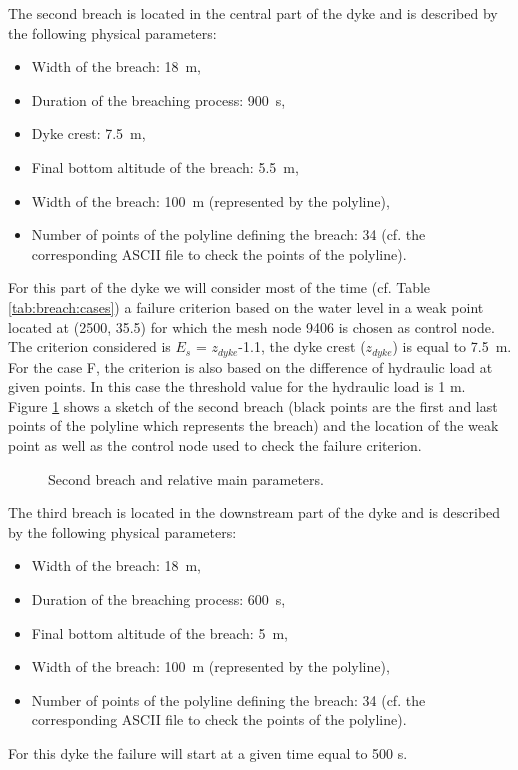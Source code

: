 The second breach is located in the central part of the dyke and is described by
the following physical parameters:
\begin{itemize}
 \item Width of the breach: 18~m,
 \item Duration of the breaching process: 900~s,
 \item Dyke crest: 7.5~m,
 \item Final bottom altitude of the breach: 5.5~m,
 \item Width of the breach: 100~m (represented by the polyline),
 \item Number of points of the polyline defining the breach: 34 (cf. the
       corresponding ASCII file to check the points of the polyline).
\end{itemize}
For this part of the dyke we will consider most of the time (cf. Table
\ref{tab:breach:cases}) a failure criterion based on the water level in a weak
point located at (2500, 35.5) for which the mesh node 9406 is chosen as control
node. The criterion considered is $E_s$ = $z_{dyke}$-1.1, the dyke crest
($z_{dyke}$) is equal to 7.5~m. \\
For the case F, the criterion is also based on the difference of hydraulic load
at given points. In this case the threshold value for the hydraulic load is 1 m. \\
Figure \ref{fig:breach:points_br2} shows a sketch of the second breach (black
points are the first and last points of the polyline which represents the breach)
and the location of the weak point as well as the control node used to check
the failure criterion.
\begin{figure}[H]
  \centering
  \caption{Second breach and relative main parameters.}\label{fig:breach:points_br2}
\end{figure}
The third breach is located in the downstream part of the dyke and is described
by the following physical parameters:
\begin{itemize}
 \item Width of the breach: 18~m,
 \item Duration of the breaching process: 600~s,
 \item Final bottom altitude of the breach: 5~m,
 \item Width of the breach: 100~m (represented by the polyline),
 \item Number of points of the polyline defining the breach: 34 (cf. the
       corresponding ASCII file to check the points of the polyline).
\end{itemize}
For this dyke the failure will start at a given time equal to 500 s.

